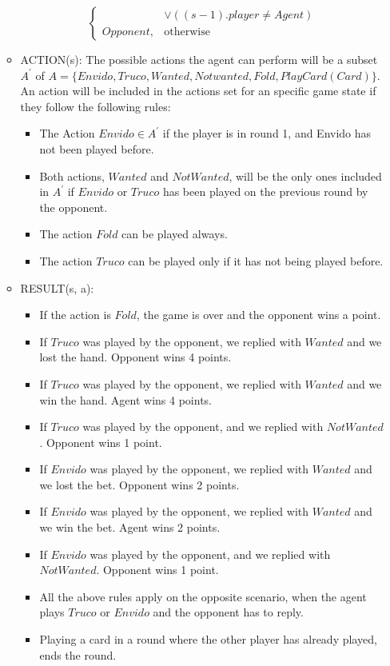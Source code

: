 \documentclass{article}
\begin{document}
\begin{enumerate}
\begin{itemize}
\[\begin{cases}
	& \lor ((s-1).player \neq Agent)  \\
	Opponent,              & \text{otherwise}
	\end{cases}
	\]
	\item ACTION(s):
	The possible actions the agent can perform will be a subset $A^\prime$ of $A = \{Envido, Truco, Wanted, Not wanted, Fold, PlayCard(Card) \}$. An action will be included in the actions set for an specific game state if they follow the following rules:
	\begin{itemize}
		\item The Action $Envido \in A^\prime$ if the player is in round 1, and Envido has not been played before.
		\item Both actions, $Wanted$ and $Not Wanted$, will be the only ones included in $A^\prime$ if $Envido$ or $Truco$ has been played on the previous round by the opponent.
		\item The action $Fold$ can be played always.
		\item The action $Truco$ can be played only if it has not being played before.
	\end{itemize}
	\item RESULT(s, a): 
	\begin{itemize}
		\item If the action is $Fold$, the game is over and the opponent wins a point.
		\item If $Truco$ was played by the opponent, we replied with $Wanted$ and we lost the hand. Opponent wins 4 points.
		\item If $Truco$ was played by the opponent, we replied with $Wanted$ and we win the hand. Agent wins 4 points.
		\item If $Truco$ was played by the opponent, and we replied with $Not Wanted$. Opponent wins 1 point.
		\item If $Envido$ was played by the opponent, we replied with $Wanted$ and we lost the bet. Opponent wins 2 points.
		\item If $Envido$ was played by the opponent, we replied with $Wanted$ and we win the bet. Agent wins 2 points.
		\item If $Envido$ was played by the opponent, and we replied with $Not Wanted$. Opponent wins 1 point.
		\item All the above rules apply on the opposite scenario, when the agent plays $Truco$ or $Envido$ and the opponent has to reply.
		\item Playing a card in a round where the other player has already played, ends the round.

\end{itemize}
\end{itemize}
\end{enumerate}
\end{document}
